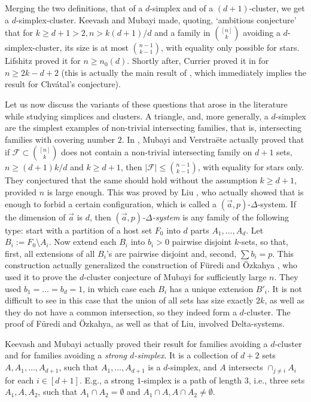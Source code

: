 \documentclass[graybox]{svmult}
\renewcommand{\le}{\leqslant}
\renewcommand{\ge}{\geqslant}
\newcommand{\ff}{\mathcal{F}}
\begin{document}
Merging the two definitions, that of a $d$-simplex and of a $(d+1)$-cluster, we get a $d$-simplex-cluster. Keevash and Mubayi made, quoting, `ambitious conjecture' that for $k\ge d+1>2, n>k(d+1)/d$ and a family in ${[n]\choose k}$ avoiding a $d$-simplex-cluster, its size is at most ${n-1\choose k-1}$, with equality only possible for stars. Lifshitz \cite{Lif} proved it for $n\ge n_0(d)$. Shortly after, Currier proved it in \cite{Curr2} for $n\ge 2k-d+2$ (this is actually the main result of \cite{Curr2}, which immediately implies the result for  Chv\'atal's conjecture).


Let us now discuss the variants of these questions that arose in the literature while studying simplices and clusters. A triangle, and, more generally, a $d$-simplex are the simplest examples of non-trivial intersecting families, that is, intersecting families with covering number $2$. In \cite{MV}, Mubayi and Verstra\"ete actually proved that if $\ff\subset {[n]\choose k}$ does not contain a non-trivial intersecting family on $d+1$ sets, $n\ge(d+1)k/d$ and $k\ge d+1$, then $|\ff|\le {n-1\choose k-1}$, with equality for stars only. They conjectured that the same should hold without the assumption $k\ge d+1$, provided $n$ is large enough. This was proved by Liu \cite{Liu}, who actually showed that is enough to forbid a certain configuration, which is called a $(\vec a,p)$-$\Delta$-system. If the dimension of $\vec a$ is $d$, then {\it $(\vec a,p)$-$\Delta$-system} is any family of the following type: start with a partition of a host set $F_0$ into $d$ parts $A_1,\ldots, A_d$. Let $B_i:= F_0\setminus A_i$. Now extend each $B_i$ into  $b_i>0$ pairwise disjoint $k$-sets, so that, first, all extensions of all $B_i$'s are pairwise disjoint and, second, $\sum b_i = p$. This construction actually generalized the construction of F\"uredi and \"Ozkahya \cite{FO}, who used it to prove the $d$-cluster conjecture of Mubayi for sufficiently large $n$. They used $b_1 =\ldots = b_d = 1$, in which case each $B_i$ has a unique extension $B'_i$. It is not difficult to see in this case that the union of all sets has size exactly $2k$, as well as they do not have a common intersection, so they indeed form a $d$-cluster. The proof of F\"uredi and \"Ozkahya, as well as that of Liu, involved Delta-systems.

Keevash and Mubayi \cite{KM} actually proved their result for families avoiding a $d$-cluster and for families avoiding a {\it strong $d$-simplex}. It is a collection of $d+2$ sets $A,A_1,\ldots, A_{d+1}$, such that $A_1,\ldots, A_{d+1}$ is a $d$-simplex, and $A$ intersects $\cap_{j\ne i}A_i$ for each $i\in[d+1]$. E.g., a strong $1$-simplex is a path of length $3$, i.e., three sets $A_1,A,A_2$, such that $A_1\cap A_2 =\emptyset$ and $A_1\cap A, A\cap A_2\ne \emptyset$.
\end{document}
